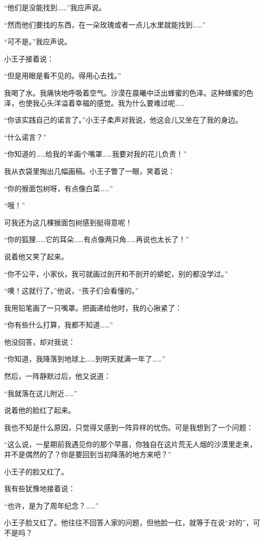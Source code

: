 “他们是没能找到\ldots{}\ldots{}”我应声说。

“然而他们要找的东西，在一朵玫瑰或者一点儿水里就能找到\ldots{}\ldots{}”

“可不是。”我应声说。

小王子接着说：

“但是用眼是看不见的。得用心去找。”

我喝了水。我痛快地呼吸着空气。沙漠在晨曦中泛出蜂蜜的色泽。这种蜂蜜的色泽，也使我心头洋溢着幸福的感觉。我为什么要难过呢\ldots{}\ldots{}

“你该实践自己的诺言了。”小王子柔声对我说，他这会儿又坐在了我的身边。

“什么诺言？”

“你知道的\ldots{}\ldots{}给我的羊画个嘴罩\ldots{}\ldots{}我要对我的花儿负责！”

我从衣袋里掏出几幅画稿。小王子瞥了一眼，笑着说：

“你的猴面包树呀，有点像白菜\ldots{}\ldots{}”

“哦！”

可我还为这几棵猴面包树感到挺得意呢！

“你的狐狸\ldots{}\ldots{}它的耳朵\ldots{}\ldots{}有点像两只角\ldots{}\ldots{}再说也太长了！”

说着他又笑了起来。

“你不公平，小家伙，我可就画过剖开和不剖开的蟒蛇，别的都没学过。”

“噢！这就行了，”他说，“孩子们会看懂的。”

我用铅笔画了一只嘴罩。把画递给他时，我的心揪紧了：

“你有些什么打算，我都不知道\ldots{}\ldots{}”

他没回答，却对我说：

“你知道，我降落到地球上\ldots{}\ldots{}到明天就满一年了\ldots{}\ldots{}”

然后，一阵静默过后，他又说道：

“我就落在这儿附近\ldots{}\ldots{}”

说着他的脸红了起来。

我也不知是什么原因，只觉得又感到一阵异样的忧伤。可是我想到了一个问题：

“这么说，一星期前我遇见你的那个早晨，你独自在这片荒无人烟的沙漠里走来，并不是偶然的了？你是要回到当初降落的地方来吧？”

小王子的脸又红了。

我有些犹豫地接着说：

“也许，是为了周年纪念？\ldots{}\ldots{}”

小王子脸又红了。他往往不回答人家的问题，但他脸一红，就等于在说“对的”，可不是吗？

